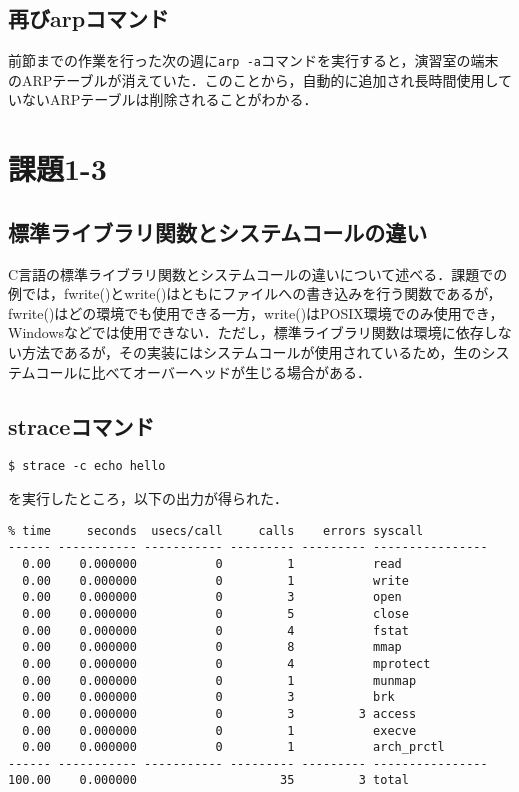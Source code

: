 \documentclass[a4j,10pt,titlepage]{jsarticle}
\begin{document}
\subsection{再びarpコマンド}
前節までの作業を行った次の週に\verb|arp -a|コマンドを実行すると，演習室の端末のARPテーブルが消えていた．このことから，自動的に追加され長時間使用していないARPテーブルは削除されることがわかる．

\section{課題1-3}
\subsection{標準ライブラリ関数とシステムコールの違い}
C言語の標準ライブラリ関数とシステムコールの違いについて述べる．課題での例では，fwrite()とwrite()はともにファイルへの書き込みを行う関数であるが，fwrite()はどの環境でも使用できる一方，write()はPOSIX環境でのみ使用でき，Windowsなどでは使用できない．ただし，標準ライブラリ関数は環境に依存しない方法であるが，その実装にはシステムコールが使用されているため，生のシステムコールに比べてオーバーヘッドが生じる場合がある．

\subsection{straceコマンド}
\begin{verbatim}
$ strace -c echo hello
\end{verbatim}
を実行したところ，以下の出力が得られた．

\begin{verbatim}
% time     seconds  usecs/call     calls    errors syscall
------ ----------- ----------- --------- --------- ----------------
  0.00    0.000000           0         1           read
  0.00    0.000000           0         1           write
  0.00    0.000000           0         3           open
  0.00    0.000000           0         5           close
  0.00    0.000000           0         4           fstat
  0.00    0.000000           0         8           mmap
  0.00    0.000000           0         4           mprotect
  0.00    0.000000           0         1           munmap
  0.00    0.000000           0         3           brk
  0.00    0.000000           0         3         3 access
  0.00    0.000000           0         1           execve
  0.00    0.000000           0         1           arch_prctl
------ ----------- ----------- --------- --------- ----------------
100.00    0.000000                    35         3 total
\end{verbatim}
\end{document}
